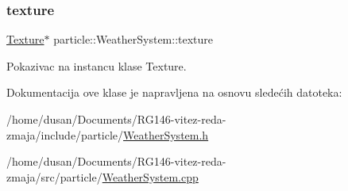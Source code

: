 \subsubsection{\texorpdfstring{texture}{texture}}
{\footnotesize\ttfamily \hyperlink{classtexture_1_1Texture}{Texture}$\ast$ particle\+::\+Weather\+System\+::texture\hspace{0.3cm}{\ttfamily [private]}}



Pokazivac na instancu klase Texture. 



Dokumentacija ove klase je napravljena na osnovu sledećih datoteka\+:\begin{DoxyCompactItemize}
\item 
/home/dusan/\+Documents/\+R\+G146-\/vitez-\/reda-\/zmaja/include/particle/\hyperlink{WeatherSystem_8h}{Weather\+System.\+h}\item 
/home/dusan/\+Documents/\+R\+G146-\/vitez-\/reda-\/zmaja/src/particle/\hyperlink{WeatherSystem_8cpp}{Weather\+System.\+cpp}\end{DoxyCompactItemize}
